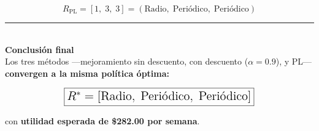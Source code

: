 \documentclass[12pt,a4paper]{article}
\begin{document}
\[
\boxed{ R_{\text{PL}} = [1,\; 3,\; 3] = (\text{Radio},\; \text{Periódico},\; \text{Periódico}) }
\]

\vspace{0.5cm}
\begin{center}
\rule{0.7\textwidth}{0.4pt}\\[0.3cm]
{\large \textbf{Conclusión final}}\\[0.3cm]
Los tres métodos ---mejoramiento sin descuento, con descuento ($\alpha=0.9$), y PL--- \textbf{convergen a la misma política óptima:}

\[
\fbox{\Large $R^* = [\text{Radio},\; \text{Periódico},\; \text{Periódico}]$}
\]

con \textbf{utilidad esperada de \$282.00 por semana}.
\end{center}
\end{document}

